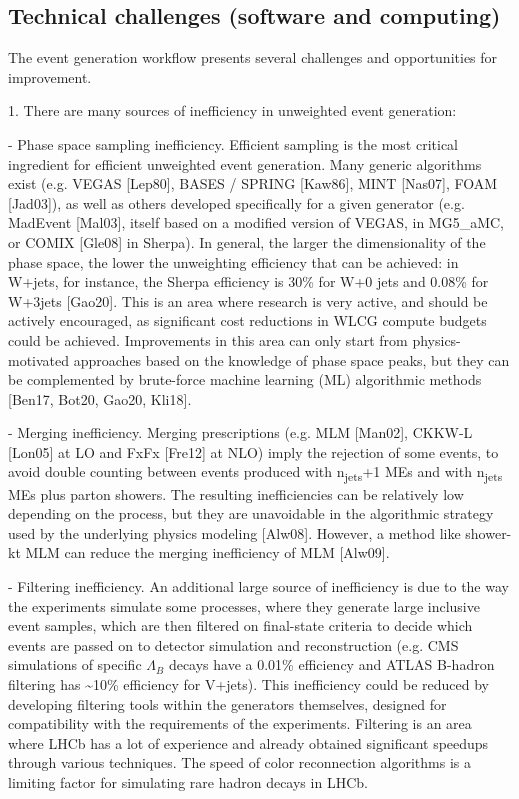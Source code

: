\documentclass[11pt,a4paper]{article}
\begin{document}
\hypertarget{technical-challenges-software-and-computing}{%
\subsection{Technical challenges (software and
computing)}\label{technical-challenges-software-and-computing}}

The event generation workflow presents several challenges and
opportunities for improvement.

1. There are many sources of inefficiency in unweighted event
generation:

- {Phase space sampling inefficiency}. Efficient sampling is the most
critical ingredient for efficient unweighted event generation. Many
generic algorithms exist (e.g. VEGAS {[}Lep80{]}, BASES / SPRING
{[}Kaw86{]}, MINT {[}Nas07{]}, FOAM {[}Jad03{]}), as well as others
developed specifically for a given generator (e.g. MadEvent {[}Mal03{]},
itself based on a modified version of VEGAS, in MG5\_aMC, or COMIX
{[}Gle08{]} in Sherpa). In general, the larger the dimensionality of the
phase space, the lower the unweighting efficiency that can be achieved:
in W+jets, for instance, the Sherpa efficiency is 30\% for W+0 jets and
0.08\% for W+3jets {[}Gao20{]}. This is an area where research is very
active, and should be actively encouraged, as significant cost
reductions in WLCG compute budgets could be achieved. Improvements in
this area can only start from physics-motivated approaches based on the
knowledge of phase space peaks, but they can be complemented by
brute-force machine learning (ML) algorithmic methods {[}Ben17, Bot20,
Gao20, Kli18{]}.

- {Merging inefficiency}. Merging prescriptions (e.g. MLM {[}Man02{]},
CKKW-L {[}Lon05{]} at LO and FxFx {[}Fre12{]} at NLO) imply the
rejection of some events, to avoid double counting between events
produced with n\textsubscript{jets}+1 MEs and with n\textsubscript{jets}
MEs plus parton showers. The resulting inefficiencies can be relatively
low depending on the process, but they are unavoidable in the
algorithmic strategy used by the underlying physics modeling
{[}Alw08{]}. However, a method like shower-kt MLM can reduce the merging
inefficiency of MLM {[}Alw09{]}.

- {Filtering inefficiency}. An additional large source of inefficiency
is due to the way the experiments simulate some processes, where they
generate large inclusive event samples, which are then ﬁltered on
ﬁnal-state criteria to decide which events are passed on to detector
simulation and reconstruction (e.g. CMS simulations of specific
$\Lambda_{B}$ decays have a 0.01\% efficiency and ATLAS B-hadron
filtering has \textasciitilde10\% efficiency for V+jets). This
inefficiency could be reduced by developing ﬁltering tools within the
generators themselves, designed for compatibility with the requirements
of the experiments. Filtering is an area where LHCb has a lot of
experience and already obtained significant speedups through various
techniques. The speed of color reconnection algorithms is a limiting
factor for simulating rare hadron decays in LHCb.
\end{document}
